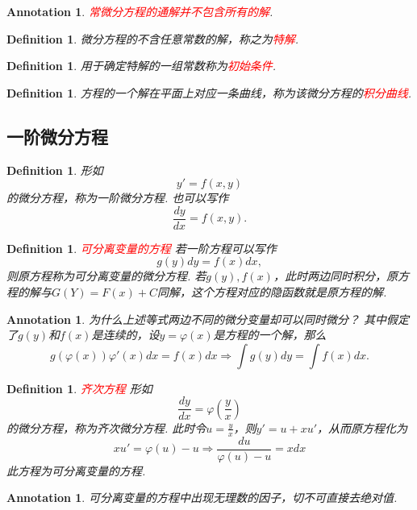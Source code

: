 \documentclass{article}
\newtheorem{definition}[theorem]{Definition}
\newtheorem{annotation}[theorem]{Annotation}
\newcommand{\redt}[1]{\textcolor{red}{#1}}
\begin{document}
\begin{annotation}
\rm \redt{常微分方程的通解并不包含所有的解}. 
\end{annotation}

\begin{definition}
\rm 微分方程的不含任意常数的解，称之为\redt{特解}.
\end{definition}

\begin{definition}
\rm 用于确定特解的一组常数称为\redt{初始条件}. 
\end{definition}

\begin{definition}
\rm 方程的一个解在平面上对应一条曲线，称为该微分方程的\redt{积分曲线}. 
\end{definition}

\subsection{一阶微分方程}

\begin{definition}
\rm 形如
$$
y'=f(x,y)
$$
的微分方程，称为一阶微分方程. 也可以写作
$$
\frac{dy}{dx} = f(x,y).
$$
\end{definition}

\begin{definition}
\rm \redt{可分离变量的方程} 若一阶方程可以写作
$$
g(y)dy = f(x)dx,
$$
则原方程称为可分离变量的微分方程. 若$g(y),f(x)$，此时两边同时积分，原方程的解与$G(Y)=F(x)+C$同解，这个方程对应的隐函数就是原方程的解.
\end{definition}

\begin{annotation}
\rm 为什么上述等式两边不同的微分变量却可以同时微分？ 其中假定了$g(y)$和$f(x)$是连续的，设$y = \varphi(x)$是方程的一个解，那么
$$
 g(\varphi(x))\varphi'(x)dx = f(x)dx \Rightarrow \int g(y)dy = \int f(x)dx.  
$$

\end{annotation}

\begin{definition}
\rm \redt{齐次方程} 形如
$$
\frac{dy}{dx} = \varphi\left(\frac{y}{x}\right)
$$
的微分方程，称为齐次微分方程. 此时令$u = \frac{y}{x}$，则$y' = u+xu'$，从而原方程化为
$$
xu' = \varphi(u) - u \Rightarrow \frac{du}{\varphi(u)-u} = xdx 
$$
此方程为可分离变量的方程. 
\end{definition}


\begin{annotation}
\rm 可分离变量的方程中出现无理数的因子，切不可直接去绝对值. 
\end{annotation}
\end{document}
